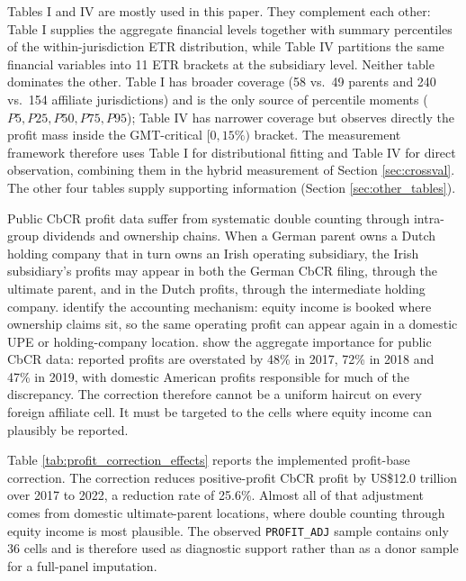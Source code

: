 \documentclass[11pt,a4paper]{article}
\newcommand{\code}[1]{\texttt{#1}}
\begin{document}
Tables I and IV are mostly used in this paper. They complement each other: Table I supplies the aggregate financial levels together with summary percentiles of the within-jurisdiction ETR distribution, while Table IV partitions the same financial variables into 11 ETR brackets at the subsidiary level. Neither table dominates the other. Table I has broader coverage (58 vs.\ 49 parents and 240 vs.\ 154 affiliate jurisdictions) and is the only source of percentile moments ($P5, P25, P50, P75, P95$); Table IV has narrower coverage but observes directly the profit mass inside the GMT-critical $[0, 15\%)$ bracket. The measurement framework therefore uses Table I for distributional fitting and Table IV for direct observation, combining them in the hybrid measurement of Section \ref{sec:crossval}. The other four tables supply supporting information (Section \ref{sec:other_tables}).

Public CbCR profit data suffer from systematic double counting through intra-group dividends and ownership chains. When a German parent owns a Dutch holding company that in turn owns an Irish operating subsidiary, the Irish subsidiary's profits may appear in both the German CbCR filing, through the ultimate parent, and in the Dutch profits, through the intermediate holding company. \citet{blouin2023} identify the accounting mechanism: equity income is booked where ownership claims sit, so the same operating profit can appear again in a domestic UPE or holding-company location. \citet{garcia-bernardo2022a} show the aggregate importance for public CbCR data: reported profits are overstated by 48\% in 2017, 72\% in 2018 and 47\% in 2019, with domestic American profits responsible for much of the discrepancy. The correction therefore cannot be a uniform haircut on every foreign affiliate cell. It must be targeted to the cells where equity income can plausibly be reported.



Table \ref{tab:profit_correction_effects} reports the implemented profit-base correction. The correction reduces positive-profit CbCR profit by US\$12.0 trillion over 2017 to 2022, a reduction rate of 25.6\%. Almost all of that adjustment comes from domestic ultimate-parent locations, where double counting through equity income is most plausible. The observed \code{PROFIT\_ADJ} sample contains only 36 cells and is therefore used as diagnostic support rather than as a donor sample for a full-panel imputation.
\end{document}
